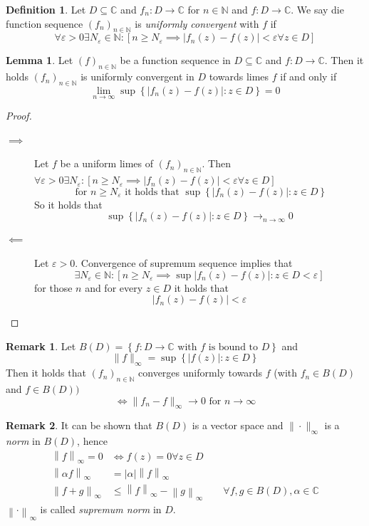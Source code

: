 \documentclass[a4paper,landscape,twocolumn]{article}
\theoremstyle{definition}
\newtheorem{defi}{Definition}
\newtheorem{rem}{Remark}
\newtheorem{lemma}{Lemma}
\newcommand\set[1]{\left\{#1\right\}}
\newcommand\abs[1]{\left|#1\right|}
\newcommand\seq[1]{{\left(#1\right)}_{n \in \mathbb N}}
\newcommand\norm[1]{\left\|#1\right\|}
\begin{document}
\begin{defi}
  Let $D \subseteq \mathbb C$ and $f_n: D \to \mathbb C$ for $n \in \mathbb N$ and
  $f: D \to \mathbb C$. We say die function sequence $\seq{f_n}$ is
  \emph{uniformly convergent} with $f$ if
  \[
    \forall \varepsilon > 0 \exists N_\varepsilon \in \mathbb N:
    \left[n \geq N_\varepsilon \implies \abs{f_n(z) - f(z)} < \varepsilon \forall z \in D\right]
  \]
\end{defi}

\begin{lemma}
  Let $\seq{f}$ be a function sequence in $D \subseteq \mathbb C$ and $f: D \to \mathbb C$.
  Then it holds $\seq{f_n}$ is uniformly convergent in $D$ towards limes $f$ if and only if
  \[ \lim_{n\to\infty} \sup\set{\abs{f_n(z) - f(z)}: z \in D} = 0 \]
\end{lemma}
\begin{proof}
  \begin{description}
    \item[$\implies$]
      Let $f$ be a uniform limes of $\seq{f_n}$. Then $\forall \varepsilon > 0
      \exists N_\varepsilon: [n \geq N_\varepsilon \implies \abs{f_n(z) - f(z)} < \varepsilon
      \forall z \in D]$
      \[
        \text{ for } n \geq N_\varepsilon \text{ it holds that }
        \sup\set{\abs{f_n(z) - f(z)}: z \in D}
      \]
      So it holds that
      \[ \sup\set{\abs{f_n(z) - f(z)}: z \in D} \to_{n\to\infty} 0 \]
    \item[$\impliedby$]
      Let $\varepsilon > 0$. Convergence of supremum sequence implies that
      \[
        \exists N_\varepsilon \in \mathbb N:
        [n \geq N_\varepsilon \implies \sup{\abs{f_n(z) - f(z)}: z \in D} < \varepsilon]
      \]
      for those $n$ and for every $z \in D$ it holds that
      \[ \abs{f_n(z) - f(z)} < \varepsilon \]
  \end{description}
\end{proof}
\begin{rem}
  Let $B(D) = \set{f: D \to \mathbb C \text{ with } f \text{ is bound to } D}$ and
  \[ \| f \|_\infty = \sup\set{\abs{f(z)}: z \in D} \]
  Then it holds that $\seq{f_n}$ converges uniformly towards $f$
  (with $f_n \in B(D)$ and $f \in B(D))$
  \[ \iff \| f_n - f \|_\infty \to 0 \text{ for } n \to \infty \]
\end{rem}
\begin{rem}
  It can be shown that $B(D)$ is a vector space and $\|\cdot \|_\infty$ is a \emph{norm}
  in $B(D)$, hence
  \begin{align*}
    \norm{f}_\infty = 0 &\iff f(z) = 0 \forall z \in D \\
    \norm{\alpha f}_{\infty} &= \abs{\alpha} \norm{f}_{\infty} \\
    \norm{f + g}_\infty &\leq \norm{f}_\infty - \norm{g}_\infty \qquad \forall f,g \in B(D), \alpha \in \mathbb C
  \end{align*}
  $\norm{\cdot}_\infty$ is called \emph{supremum norm} in $D$.
\end{rem}
\end{document}
